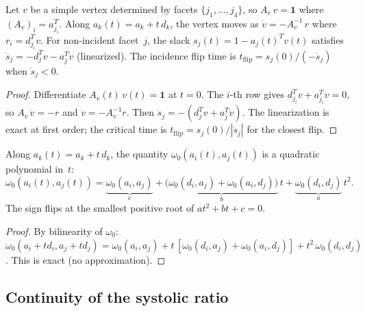 \begin{lemma}\label{lem:step-bound-incidence}
Let $v$ be a simple vertex determined by facets $\{j_1, \ldots, j_4\}$, so
$A_v \, v = \mathbf{1}$ where $(A_v)_i = a_{j_i}^T$.
Along $a_k(t) = a_k + t \, d_k$, the vertex moves as
$\dot{v} = -A_v^{-1} \, r$ where $r_i = d_{j_i}^T v$.
For non-incident facet~$j$, the slack $s_j(t) = 1 - a_j(t)^T v(t)$ satisfies
$\dot{s}_j = -d_j^T v - a_j^T \dot{v}$ (linearized).
The incidence flip time is $t_{\mathrm{flip}} = s_j(0) / (-\dot{s}_j)$
when $\dot{s}_j < 0$.
\end{lemma}
\begin{proof}
Differentiate $A_v(t) \, v(t) = \mathbf{1}$ at $t = 0$.
The $i$-th row gives $d_{j_i}^T v + a_{j_i}^T \dot{v} = 0$,
so $A_v \, \dot{v} = -r$ and $\dot{v} = -A_v^{-1} r$.
Then $\dot{s}_j = -(d_j^T v + a_j^T \dot{v})$.
The linearization is exact at first order; the critical time is
$t_{\mathrm{flip}} = s_j(0) / |\dot{s}_j|$ for the closest flip.
\end{proof}

\begin{lemma}\label{lem:step-bound-omega}
Along $a_k(t) = a_k + t \, d_k$, the quantity
$\omega_0(a_i(t), a_j(t))$ is a quadratic polynomial in~$t$:
\[
  \omega_0(a_i(t), a_j(t))
  = \underbrace{\omega_0(a_i, a_j)}_{c}
  + \underbrace{\bigl(\omega_0(d_i, a_j) + \omega_0(a_i, d_j)\bigr)}_{b} \, t
  + \underbrace{\omega_0(d_i, d_j)}_{a} \, t^2.
\]
The sign flips at the smallest positive root of $a t^2 + b t + c = 0$.
\end{lemma}
\begin{proof}
By bilinearity of $\omega_0$:
$\omega_0(a_i + t d_i, a_j + t d_j)
 = \omega_0(a_i, a_j) + t\,[\omega_0(d_i, a_j) + \omega_0(a_i, d_j)]
   + t^2\,\omega_0(d_i, d_j)$.
This is exact (no approximation).
\end{proof}

\subsection{Continuity of the systolic ratio}
\label{sec:sys-continuity}


